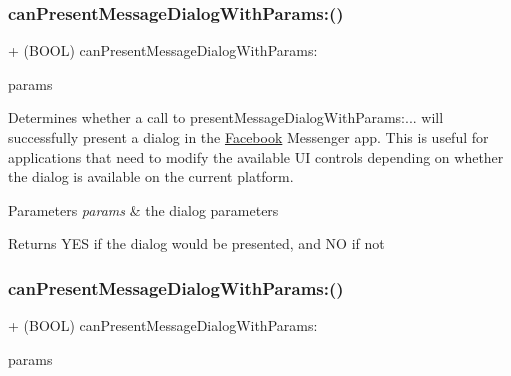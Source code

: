 \subsubsection{\texorpdfstring{can\+Present\+Message\+Dialog\+With\+Params\+:()}{canPresentMessageDialogWithParams:()}\hspace{0.1cm}{\footnotesize\ttfamily [1/5]}}
{\footnotesize\ttfamily + (B\+O\+OL) can\+Present\+Message\+Dialog\+With\+Params\+: \begin{DoxyParamCaption}\item[{(\hyperlink{interfaceFBLinkShareParams}{F\+B\+Link\+Share\+Params} $\ast$)}]{params }\end{DoxyParamCaption}}

Determines whether a call to {\ttfamily present\+Message\+Dialog\+With\+Params\+:...} will successfully present a dialog in the \hyperlink{interfaceFacebook}{Facebook} Messenger app. This is useful for applications that need to modify the available UI controls depending on whether the dialog is available on the current platform.


\begin{DoxyParams}{Parameters}
{\em params} & the dialog parameters\\
\hline
\end{DoxyParams}
\begin{DoxyReturn}{Returns}
Y\+ES if the dialog would be presented, and NO if not 
\end{DoxyReturn}
\mbox{\label{interfaceFBDialogs_a81544299ca98179464ec34fc0e8d12b7}} 
\subsubsection{\texorpdfstring{can\+Present\+Message\+Dialog\+With\+Params\+:()}{canPresentMessageDialogWithParams:()}\hspace{0.1cm}{\footnotesize\ttfamily [2/5]}}
{\footnotesize\ttfamily + (B\+O\+OL) can\+Present\+Message\+Dialog\+With\+Params\+: \begin{DoxyParamCaption}\item[{(\hyperlink{interfaceFBLinkShareParams}{F\+B\+Link\+Share\+Params} $\ast$)}]{params }\end{DoxyParamCaption}}

